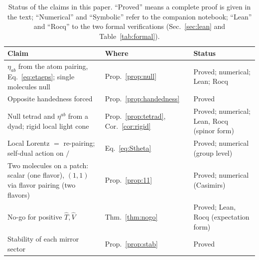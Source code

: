 \documentclass[reprint,aps,prd,amsmath,amssymb,superscriptaddress,nofootinbib,floatfix]{revtex4-2}
\theoremstyle{plain}
\theoremstyle{definition}
\theoremstyle{remark}
\newcommand{\Lat}{\ensuremath{/}}                 %
\newcommand{\Tc}{\hat{T}}
\newcommand{\Vc}{\hat{V}}
\begin{document}
\begin{table}[t]
\caption{\label{tab:audit}Status of the claims in this paper. ``Proved'' means a complete proof is given in
the text; ``Numerical'' and ``Symbolic'' refer to the companion notebook; ``Lean'' and ``Rocq'' to the two
formal verifications (Sec.~\ref{sec:lean} and Table~\ref{tab:formal}).}
\begin{ruledtabular}
\begin{tabular}{lll}
\parbox[t]{0.52\textwidth}{\raggedright Claim\strut} & \parbox[t]{0.17\textwidth}{\raggedright Where\strut} & \parbox[t]{0.25\textwidth}{\raggedright Status\strut} \\
\hline
\parbox[t]{0.52\textwidth}{\raggedright $\eta_{ab}$ from the atom pairing, Eq.~\eqref{eq:etaeps}; single molecules null\strut} & \parbox[t]{0.17\textwidth}{\raggedright Prop.~\ref{prop:null}\strut} & \parbox[t]{0.25\textwidth}{\raggedright Proved; numerical; Lean; Rocq\strut} \\
\parbox[t]{0.52\textwidth}{\raggedright Opposite handedness forced\strut} & \parbox[t]{0.17\textwidth}{\raggedright Prop.~\ref{prop:handedness}\strut} & \parbox[t]{0.25\textwidth}{\raggedright Proved\strut} \\
\parbox[t]{0.52\textwidth}{\raggedright Null tetrad and $\eta^{ab}$ from a dyad; rigid local light cone\strut} & \parbox[t]{0.17\textwidth}{\raggedright Prop.~\ref{prop:tetrad}, Cor.~\ref{cor:rigid}\strut} & \parbox[t]{0.25\textwidth}{\raggedright Proved; numerical; Lean, Rocq (spinor form)\strut} \\
\parbox[t]{0.52\textwidth}{\raggedright Local Lorentz $=$ re-pairing; self-dual action on $\Lat$\strut} & \parbox[t]{0.17\textwidth}{\raggedright Eq.~\eqref{eq:Stheta}\strut} & \parbox[t]{0.25\textwidth}{\raggedright Proved; numerical (group level)\strut} \\
\parbox[t]{0.52\textwidth}{\raggedright Two molecules on a patch: scalar (one flavor), $(1,1)$ via flavor pairing (two flavors)\strut} & \parbox[t]{0.17\textwidth}{\raggedright Prop.~\ref{prop:11}\strut} & \parbox[t]{0.25\textwidth}{\raggedright Proved; numerical (Casimirs)\strut} \\
\parbox[t]{0.52\textwidth}{\raggedright No-go for positive $\Tc,\Vc$\strut} & \parbox[t]{0.17\textwidth}{\raggedright Thm.~\ref{thm:nogo}\strut} & \parbox[t]{0.25\textwidth}{\raggedright Proved; Lean, Rocq (expectation form)\strut} \\
\parbox[t]{0.52\textwidth}{\raggedright Stability of each mirror sector\strut} & \parbox[t]{0.17\textwidth}{\raggedright Prop.~\ref{prop:stab}\strut} & \parbox[t]{0.25\textwidth}{\raggedright Proved\strut} \\

\end{tabular}
\end{ruledtabular}
\end{table}
\end{document}

